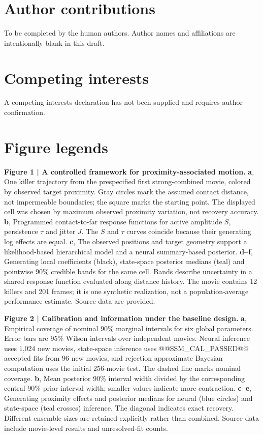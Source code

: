 \documentclass[12pt]{article}
\begin{document}
\section*{Author contributions}
To be completed by the human authors. Author names and affiliations are intentionally blank in this draft.
\section*{Competing interests}
A competing interests declaration has not been supplied and requires author confirmation.

\clearpage
\section*{Figure legends}
\textbf{Figure 1 | A controlled framework for proximity-associated motion.}
\textbf{a}, One killer trajectory from the prespecified first strong-combined movie, colored by observed target proximity. Gray circles mark the assumed contact distance, not impermeable boundaries; the square marks the starting point. The displayed cell was chosen by maximum observed proximity variation, not recovery accuracy. \textbf{b}, Programmed contact-to-far response functions for active amplitude $S$, persistence $\tau$ and jitter $J$. The $S$ and $\tau$ curves coincide because their generating log effects are equal. \textbf{c}, The observed positions and target geometry support a likelihood-based hierarchical model and a neural summary-based posterior. \textbf{d--f}, Generating local coefficients (black), state-space posterior medians (teal) and pointwise 90\% credible bands for the same cell. Bands describe uncertainty in a shared response function evaluated along distance history. The movie contains 12 killers and 201 frames; it is one synthetic realization, not a population-average performance estimate. Source data are provided.

\textbf{Figure 2 | Calibration and information under the baseline design.}
\textbf{a}, Empirical coverage of nominal 90\% marginal intervals for six global parameters. Error bars are 95\% Wilson intervals over independent movies. Neural inference uses 1,024 new movies, state-space inference uses @@SSM_CAL_PASSED@@ accepted fits from 96 new movies, and rejection approximate Bayesian computation uses the initial 256-movie test. The dashed line marks nominal coverage. \textbf{b}, Mean posterior 90\% interval width divided by the corresponding central 90\% prior interval width; smaller values indicate more contraction. \textbf{c--e}, Generating proximity effects and posterior medians for neural (blue circles) and state-space (teal crosses) inference. The diagonal indicates exact recovery. Different ensemble sizes are retained explicitly rather than combined. Source data include movie-level results and unresolved-fit counts.
\end{document}
